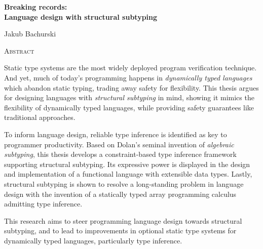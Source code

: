 \vspace*{1cm}
\begin{center}
  \Large
  \textbf{Breaking records: \\ Language design with structural subtyping}
\end{center}
\ifanonymised\else
\vspace{0.5cm}
\begin{center}
  \Large Jakub Bachurski
\end{center}
\fi
\vspace{1.5cm}
\begin{center}
  \Large
  \textsc{Abstract}
\end{center}
\vspace{0.2cm}
%
\begin{center}
\begin{minipage}{0.6\textwidth}
    \setlength{\parindent}{1em}
    Static type systems are the most widely deployed program verification technique. 
    And yet, much of today's programming happens in \emph{dynamically typed languages} which abandon static typing, trading away safety for flexibility. 
    This thesis argues for designing languages with \emph{structural subtyping} in mind, showing it mimics the flexibility of dynamically typed languages, while providing safety guarantees like traditional approaches. 

    To inform language design, reliable type inference is identified as key to programmer productivity. Based on Dolan's seminal invention of \emph{algebraic subtyping}, this thesis develops a constraint-based type inference framework supporting structural subtyping. Its expressive power is displayed in the design and implementation of a functional language with extensible data types. Lastly, structural subtyping is shown to resolve a long-standing problem in language design with the invention of a statically typed array programming calculus admitting type inference.

    This research aims to steer programming language design towards structural subtyping, and to lead to improvements in optional static type systems for dynamically typed languages, particularly type inference.
\end{minipage}
\end{center}